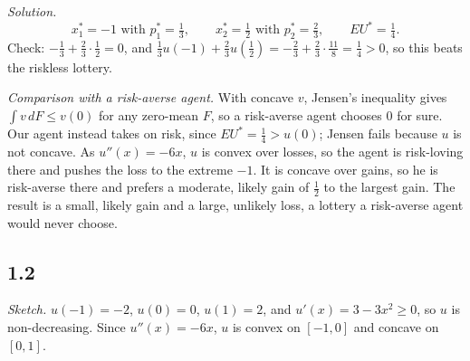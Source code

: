 \documentclass[12pt,letterpaper]{article}
\begin{document}
\textit{Solution.}
\[
x_1^*=-1 \text{ with } p_1^*=\tfrac13,\qquad x_2^*=\tfrac12 \text{ with } p_2^*=\tfrac23,\qquad EU^*=\tfrac14 .
\]
Check: $-\tfrac13+\tfrac23\cdot\tfrac12=0$, and $\tfrac13 u(-1)+\tfrac23 u(\tfrac12)=-\tfrac23+\tfrac23\cdot\tfrac{11}{8}=\tfrac14>0$, so this beats the riskless lottery.

\textit{Comparison with a risk-averse agent.} With concave $v$, Jensen's inequality gives $\int v\,dF\le v(0)$ for any zero-mean $F$, so a risk-averse agent chooses $0$ for sure. Our agent instead takes on risk, since $EU^*=\tfrac14>u(0)$; Jensen fails because $u$ is not concave. As $u''(x)=-6x$, $u$ is convex over losses, so the agent is risk-loving there and pushes the loss to the extreme $-1$. It is concave over gains, so he is risk-averse there and prefers a moderate, likely gain of $\tfrac12$ to the largest gain. The result is a small, likely gain and a large, unlikely loss, a lottery a risk-averse agent would never choose.

\subsection*{1.2}

\textit{Sketch.} $u(-1)=-2$, $u(0)=0$, $u(1)=2$, and $u'(x)=3-3x^2\ge0$, so $u$ is non-decreasing. Since $u''(x)=-6x$, $u$ is convex on $[-1,0]$ and concave on $[0,1]$.

\begin{center}
\end{center}
\end{document}
